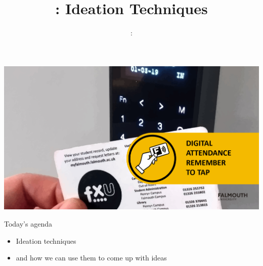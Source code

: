 \usepackage{../../beamerthemeFalmouthGamesAcademy}
\usepackage{multimedia}
\graphicspath{ {../../} }


\usepackage[normalem]{ulem}
\usepackage{wasysym}
\usepackage{graphicx} %

\usepackage{pdfpages}

\usetikzlibrary{arrows,automata}





\title{\sessionnumber: Ideation Techniques}
\subtitle{\modulecode: \moduletitle}

\begin{frame}
	\includegraphics[width=1.0\textwidth]{sign-in}
\end{frame}

\frame{\titlepage} 


\begin{frame}{Today's agenda}
	\begin{itemize}
		\item Ideation techniques
		\item and how we can use them to come up with ideas
	\end{itemize}
\end{frame}


